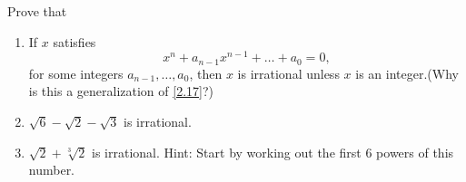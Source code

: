 \begin{pr}[*] \label{2.18} %
  Prove that
  \begin{enumerate}[label=(\alph*)]
    \item \label{2.18:a} If $x$ satisfies
    \begin{equation*}
      x^n + a_{n-1}x^{n-1} + \dots + a_0 = 0,
    \end{equation*}
    for some integers $a_{n-1},\dots,a_0$, then $x$ is
    irrational unless $x$ is an integer.(Why is this
    a generalization of \autoref{2.17}?)
    \item $\sqrt{6} - \sqrt{2} - \sqrt{3}$ is irrational.
    \item $\sqrt{2} + \sqrt[3]{2}$ is irrational. Hint: Start
    by working out the first $6$ powers of this number.
  \end{enumerate}
\end{pr}

